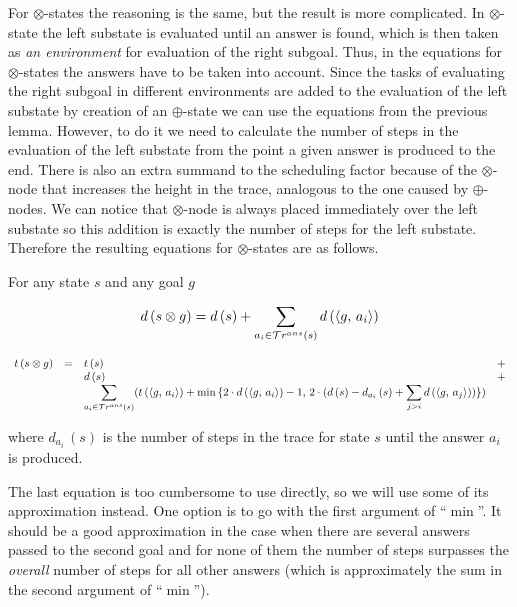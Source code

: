 For $\otimes$-states the reasoning is the same, but the result is more complicated. In $\otimes$-state the left substate is evaluated until an answer is found, which is then taken as
\emph{an environment} for evaluation of the right subgoal. Thus, in the equations for $\otimes$-states the answers
have to be taken into account. Since the tasks of evaluating the right subgoal in different environments are added to the evaluation of the left substate by creation of an $\oplus$-state
we can use the equations from the previous lemma. However, to do it we need to calculate the number of steps in the evaluation of the left substate from the point a given answer is produced
to the end. There is also an extra summand to the scheduling factor because of the $\otimes$-node that increases the height in the trace, analogous to the one caused by $\oplus$-nodes.
We can notice that $\otimes$-node is always placed immediately over the left substate so this addition is exactly the number of steps for the left substate. Therefore the resulting
equations for $\otimes$-states are as follows.

\begin{lemma}
For any state $s$ and any goal $g$

\[
d\,(s \otimes g) = d\,(s) + \displaystyle\sum\limits_{a_i \in \mathcal{T}r^{ans}(s)} d\,(\langle g ,\, a_i \rangle)
\]

\[
\begin{array}{rclc}
  t\,(s \otimes g) &=& t\,(s) & + \\
                   & & d\,(s) & + \\
  & & \displaystyle\sum\limits_{a_i \in \mathcal{T}r^{ans}(s)} (t\,(\langle g ,\, a_i \rangle) + \min\,\{2\cdot d\,(\langle g ,\, a_i \rangle) - 1,\,2\cdot (d\,(s) - d_{a_i}\,(s) + \displaystyle\sum\limits_{j > i} d\,(\langle g ,\, a_j \rangle))\})
\end{array}
\]

where $d_{a_i}\,(s)$ is the number of steps in the trace for state $s$ until the answer $a_i$ is produced.
\end{lemma}

The last equation is too cumbersome to use directly, so we will use some of its approximation instead. One option is to go with the first argument of ``$\min$''. It should be a good approximation
in the case when there are several answers passed to the second goal and for none of them the number of steps surpasses the \emph{overall} number of steps for all other answers (which is approximately the sum in the second argument of ``$\min$'').

